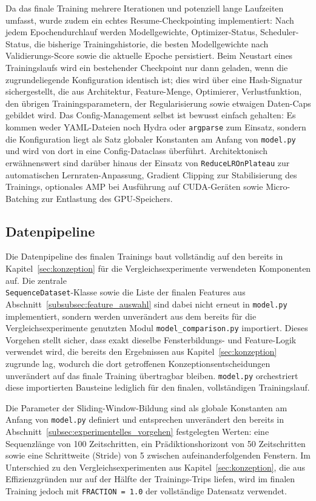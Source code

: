 Da das finale Training mehrere Iterationen und potenziell lange Laufzeiten umfasst, wurde zudem ein echtes Resume-Checkpointing implementiert: Nach jedem Epochendurchlauf werden Modellgewichte, Optimizer-Status, Scheduler-Status, die bisherige Trainingshistorie, die besten Modellgewichte nach Validierungs-Score sowie die aktuelle Epoche persistiert. Beim Neustart eines Trainingslaufs wird ein bestehender Checkpoint nur dann geladen, wenn die zugrundeliegende Konfiguration identisch ist; dies wird über eine Hash-Signatur sichergestellt, die aus Architektur, Feature-Menge, Optimierer, Verlustfunktion, den übrigen Trainingsparametern, der Regularisierung sowie etwaigen Daten-Caps gebildet wird. Das Config-Management selbst ist bewusst einfach gehalten: Es kommen weder YAML-Dateien noch Hydra oder \texttt{argparse} zum Einsatz, sondern die Konfiguration liegt als Satz globaler Konstanten am Anfang von \texttt{model.py} und wird von dort in eine Config-Dataclass überführt. Architektonisch erwähnenswert sind darüber hinaus der Einsatz von \texttt{ReduceLROnPlateau} zur automatischen Lernraten-Anpassung, Gradient Clipping zur Stabilisierung des Trainings, optionales \gls{AMP} bei Ausführung auf CUDA-Geräten sowie Micro-Batching zur Entlastung des \gls{GPU}-Speichers.

\subsection{Datenpipeline}
\label{subsec:datenpipeline}

Die Datenpipeline des finalen Trainings baut vollständig auf den bereits in Kapitel~\ref{sec:konzeption} für die Vergleichsexperimente verwendeten Komponenten auf. Die zentrale \\\texttt{SequenceDataset}-Klasse sowie die Liste der finalen Features aus Abschnitt~\ref{subsubsec:feature_auswahl} sind dabei nicht erneut in \texttt{model.py} implementiert, sondern werden unverändert aus dem bereits für die Vergleichsexperimente genutzten Modul \texttt{model\_comparison.py} importiert. Dieses Vorgehen stellt sicher, dass exakt dieselbe Fensterbildungs- und Feature-Logik verwendet wird, die bereits den Ergebnissen aus Kapitel~\ref{sec:konzeption} zugrunde lag, wodurch die dort getroffenen Konzeptionsentscheidungen unverändert auf das finale Training übertragbar bleiben. \texttt{model.py} orchestriert diese importierten Bausteine lediglich für den finalen, vollständigen Trainingslauf.

Die Parameter der Sliding-Window-Bildung sind als globale Konstanten am Anfang von \texttt{model.py} definiert und entsprechen unverändert den bereits in Abschnitt~\ref{subsec:experimentelles_vorgehen} festgelegten Werten: eine Sequenzlänge von 100 Zeitschritten, ein Prädiktionshorizont von 50 Zeitschritten sowie eine Schrittweite (Stride) von 5 zwischen aufeinanderfolgenden Fenstern. Im Unterschied zu den Vergleichsexperimenten aus Kapitel~\ref{sec:konzeption}, die aus Effizienzgründen nur auf der Hälfte der Trainings-Trips liefen, wird im finalen Training jedoch mit \texttt{FRACTION = 1.0} der vollständige Datensatz verwendet.

